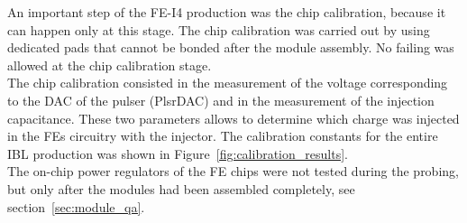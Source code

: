 %



An important step of the FE-I4 production was the chip calibration, because it can happen only at this stage. The chip calibration was carried out by using dedicated pads that cannot be bonded after the module assembly. No failing was allowed at the chip calibration stage.\\
The chip calibration consisted in the measurement of the voltage corresponding to the DAC of the pulser (PlsrDAC) and in the measurement of the injection capacitance. These two parameters allows to determine which charge was injected in the FEs circuitry with the injector. The calibration constants for the entire IBL production was shown in Figure~\ref{fig:calibration_results}.\\
The on-chip power regulators of the FE chips were not tested during the probing, but only after the modules had been assembled completely, see section~\ref{sec:module_qa}.


